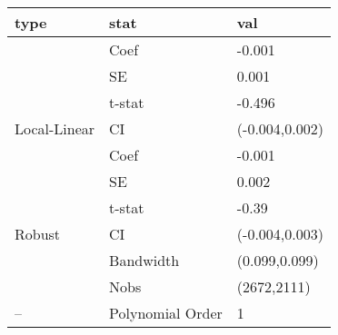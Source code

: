 
\begin{tabular}{lll}
\toprule
type & stat & val\\
\midrule
 & Coef & -0.001\\

 & SE & 0.001\\

 & t-stat & -0.496\\

\multirow{-4}{*}{\raggedright\arraybackslash Local-Linear} & CI & (-0.004,0.002)\\
\cmidrule{1-3}
 & Coef & -0.001\\

 & SE & 0.002\\

 & t-stat & -0.39\\

\multirow{-4}{*}{\raggedright\arraybackslash Robust} & CI & (-0.004,0.003)\\
\cmidrule{1-3}
 & Bandwidth & (0.099,0.099)\\

 & Nobs & (2672,2111)\\

\multirow{-3}{*}{\raggedright\arraybackslash --} & Polynomial Order & 1\\
\bottomrule
\end{tabular}